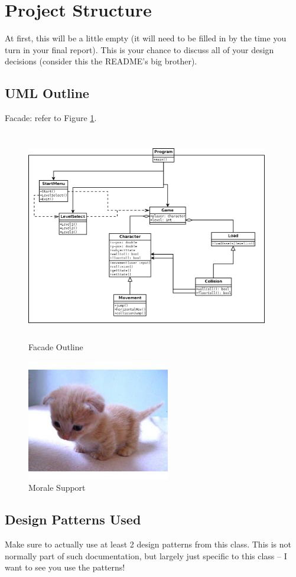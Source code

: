 \documentclass[10pt,conference,onecolumn,compsoc]{IEEEtran}
\begin{document}
\section{Project Structure}
At first, this will be a little empty (it will need to be filled in by the time you turn in your final report).  This is your chance to discuss all of your design decisions (consider this the README's big brother).

\subsection{UML Outline}
Facade: refer to Figure \ref{Facade}.
\begin{figure}[ht!]
\includegraphics[height=350px, width=400px]{Facade.png}
\caption{Facade Outline}
\label{Facade}
\end{figure}

\begin{figure}[ht!]
\includegraphics[scale=1.5]{cat2.jpg}
\caption{Morale Support}
\label{cat2}
\end{figure}


\subsection{Design Patterns Used}
Make sure to actually use at least 2 design patterns from this class.  This is not normally part of such documentation, but largely just specific to this class -- I want to see you use the patterns!
\end{document}
